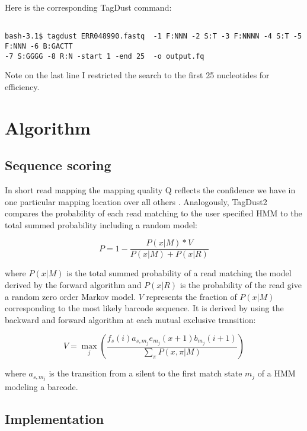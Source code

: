 \documentclass[11pt,a4paper,oneside]{book}
\begin{document}
Here is the corresponding TagDust command: 


{\small
\begin{verbatim}

bash-3.1$ tagdust ERR048990.fastq  -1 F:NNN -2 S:T -3 F:NNNN -4 S:T -5 F:NNN -6 B:GACTT
-7 S:GGGG -8 R:N -start 1 -end 25  -o output.fq
\end{verbatim}
}

Note on the last line I restricted the search to the first 25 nucleotides for efficiency. 

\chapter{Algorithm}

\section{Sequence scoring} 

In short read mapping the mapping quality Q reflects the confidence we have in one particular mapping location over all others \cite{Li:2008ip}. Analogously, TagDust2 compares the probability of each read matching to the user specified HMM to the total summed probability including a random model:

\begin{equation}
P = 1 - \frac{P(x|M)*V}{P(x|M) + P(x|R)}
\end{equation} 

where $P(x|M)$ is the total summed probability of a read matching the model derived by the forward algorithm and $P(x|R)$ is the probability of the read give a random zero order Markov model. $V$ represents the fraction of $P(x|M)$ corresponding to the most likely barcode sequence. It is derived by using the backward and forward algorithm at each mutual exclusive transition:

\begin{equation}
	V = \max_j \left( \frac{f_s(i)   a_{s,m_j} e_{m_j}(x+1) b_{m_j}(i+1)}{\sum\limits_{\pi} P(x,\pi | M )}\right)
\end{equation}

where $ a_{s,m_j}$ is the transition from a silent to the first match state $m_j$ of a HMM modeling a barcode.  
 


\section{Implementation} 
\end{document}
